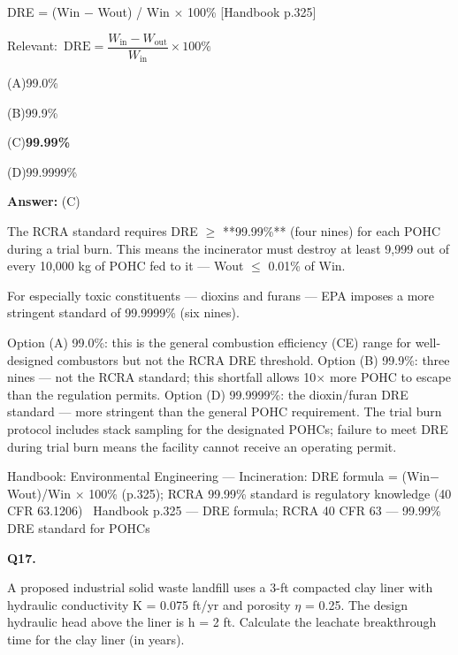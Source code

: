 \documentclass[11pt]{article}
\newcommand{\correct}[1]{\textbf{#1}\;{\color{accent}$\checkmark$}}
\newcommand{\optline}[2]{\par\noindent\hspace{1.2em}(#1)\hspace{0.6em}#2}
\begin{document}
DRE = (Win $-$ Wout) / Win $\times$ 100\%   [Handbook p.325]\par\vspace{3pt}
{\small\color{soft}Relevant:}\ $\text{DRE} = \dfrac{W_{\text{in}} - W_{\text{out}}}{W_{\text{in}}} \times 100\%$\par\vspace{3pt}
\optline{A}{99.0\%}
\optline{B}{99.9\%}
\optline{C}{\correct{99.99\%}}
\optline{D}{99.9999\%}
\par\vspace{3pt}
\vspace{2pt}\par\noindent\colorbox{boxbg}{\parbox{\dimexpr\linewidth-2\fboxsep\relax}{%
\vspace{2pt}\textbf{Answer:} (C)\par\vspace{2pt}
{\small The RCRA standard requires DRE $\ge$ **99.99\%** (four nines) for each POHC during a trial burn. This means the incinerator must destroy at least 9,999 out of every 10,000 kg of POHC fed to it --- Wout $\le$ 0.01\% of Win.

For especially toxic constituents --- dioxins and furans --- EPA imposes a more stringent standard of 99.9999\% (six nines).

Option (A) 99.0\%: this is the general combustion efficiency (CE) range for well-designed combustors but not the RCRA DRE threshold. Option (B) 99.9\%: three nines --- not the RCRA standard; this shortfall allows 10$\times$ more POHC to escape than the regulation permits. Option (D) 99.9999\%: the dioxin/furan DRE standard --- more stringent than the general POHC requirement. The trial burn protocol includes stack sampling for the designated POHCs; failure to meet DRE during trial burn means the facility cannot receive an operating permit.}\par\vspace{2pt}
{\footnotesize\color{soft}Handbook: Environmental Engineering --- Incineration: DRE formula = (Win$-$Wout)/Win $\times$ 100\% (p.325); RCRA 99.99\% standard is regulatory knowledge (40 CFR 63.1206) \textbullet\ Handbook p.325 --- DRE formula; RCRA 40 CFR 63 --- 99.99\% DRE standard for POHCs}\vspace{2pt}
}}
\vspace{9pt}
\filbreak
\textbf{\color{accent}Q17.}\par\vspace{2pt}
A proposed industrial solid waste landfill uses a 3-ft compacted clay liner with hydraulic conductivity K = 0.075 ft/yr and porosity $\eta$ = 0.25. The design hydraulic head above the liner is h = 2 ft. Calculate the leachate breakthrough time for the clay liner (in years).
\end{document}
